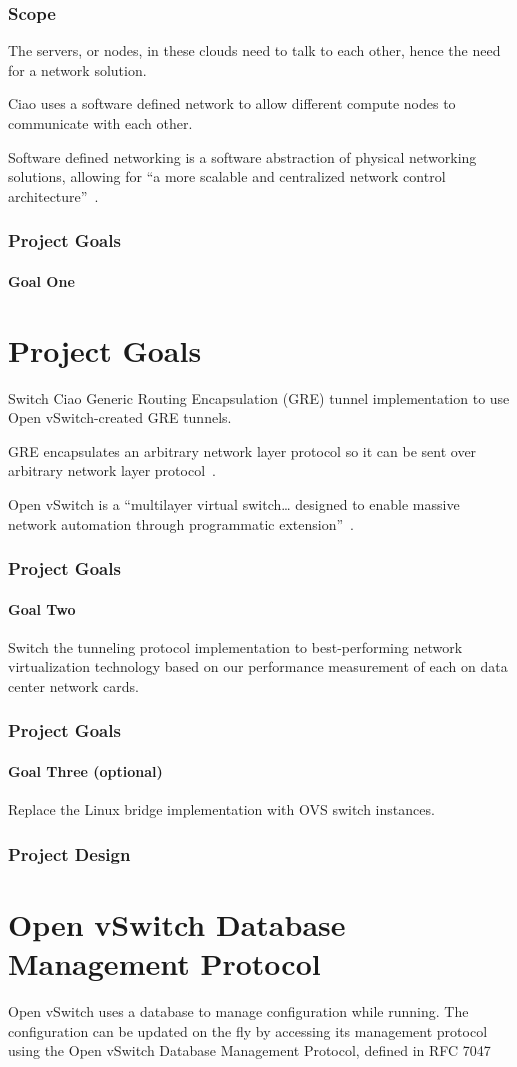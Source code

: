 \documentclass[pdf]{beamer}
\begin{document}
\begin{frame}
	\frametitle{Scope}
	The servers, or nodes, in these clouds need to talk to each other, hence
	the need for a network solution.

	Ciao uses a software defined network to allow different compute nodes to
	communicate with each other.

	Software defined networking is a software abstraction of physical
	networking solutions, allowing for ``a more scalable and centralized
	network control architecture''~\cite{goransson}.
\end{frame}

\begin{frame}
	\frametitle{Project Goals}
	\framesubtitle{Goal One}
	\section{Project Goals}
	Switch Ciao Generic Routing Encapsulation (GRE) tunnel implementation to
	use Open vSwitch-created GRE tunnels.

	\begin{description}[style=nextline]
		\item[Generic Routing Encapsulation (GRE)]
			GRE encapsulates an arbitrary network layer protocol so
			it can be sent over arbitrary network layer
			protocol~\cite{rfc1701}.
		\item[Open vSwitch (OVS)]
			Open vSwitch is a ``multilayer virtual switch\ldots
			designed to enable massive network automation through
			programmatic extension''~\cite{ovs}.
	\end{description}
\end{frame}

\begin{frame}
	\frametitle{Project Goals}
	\framesubtitle{Goal Two}
	Switch the tunneling protocol implementation to best-performing network
	virtualization technology based on our performance measurement of each
	on data center network cards.
\end{frame}

\begin{frame}
	\frametitle{Project Goals}
	\framesubtitle{Goal Three (optional)}
	Replace the Linux bridge implementation with OVS switch instances.
\end{frame}

\begin{frame}
	\frametitle{Project Design}
	\section{Open vSwitch Database Management Protocol}
	Open vSwitch uses a database to manage configuration while running.
	The configuration can be updated on the fly by accessing its management
	protocol using the Open vSwitch Database Management Protocol, defined
	in RFC 7047\cite{rfc7047}
\end{frame}
\end{document}
